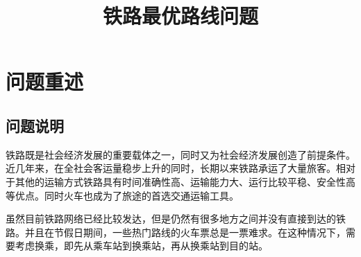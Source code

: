 \documentclass[UTF8]{ctexart}
\begin{document}
\title{铁路最优路线问题}

\maketitle

%
%




\section{问题重述}
\subsection{问题说明}
铁路既是社会经济发展的重要载体之一，同时又为社会经济发展创造了前提条件。近几年来，在全社会客运量稳步上升的同时，长期以来铁路承运了大量旅客。相对于其他的运输方式铁路具有时间准确性高、运输能力大、运行比较平稳、安全性高等优点。同时火车也成为了旅途的首选交通运输工具。

虽然目前铁路网络已经比较发达，但是仍然有很多地方之间并没有直接到达的铁路。并且在节假日期间，一些热门路线的火车票总是一票难求。在这种情况下，需要考虑换乘，即先从乘车站到换乘站，再从换乘站到目的站。
\end{document}
